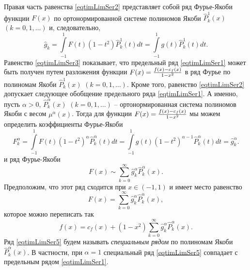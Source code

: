 Правая часть равенства \eqref{eqtimLimSer2} представляет собой ряд Фурье-Якоби функции $F(x)$ по ортонормированной системе полиномов Якоби $\hat P_k^1(x)$ $(k=0,1,\ldots)$ и, следовательно,
\begin{equation}\label{eqtimLimSer3}%
\hat g_k=\int\limits_{-1}^1F(t)(1-t^2)\hat P_k^1(t)dt
=\int\limits_{-1}^1g(t)\hat P_k^1(t)dt.
\end{equation}
Равенство \eqref{eqtimLimSer3} показывает, что предельный ряд \eqref{eqtimLimSer1} может быть получен путем разложения функции $F(x)={f(x)-c_f(x)\over 1-x^2}$
в ряд Фурье по полиномам Якоби $\hat P_k^1(x)$ $(k=0,1,\ldots)$. Кроме того, равенство \eqref{eqtimLimSer2} допускает следующее обобщение предельного ряда \eqref{eqtimLimSer1}. А именно, пусть $\alpha>0$,  $\hat P_k^\alpha(x)$ $(k=0,1,\ldots)$ -- ортонормированная система полиномов Якоби с весом $\mu^\alpha(x)$. Тогда для функции $F(x)={f(x)-c_f(x)\over 1-x^2}$ мы можем определить коэффициенты Фурье-Якоби
\begin{equation}\label{eqtimLimSer3}%
F_k^\alpha=\int\limits_{-1}^1F(t)(1-t^2)^\alpha\hat P_k^\alpha(t)dt=
\int\limits_{-1}^1g(t)(1-t^2)^{\alpha-1}\hat P_k^\alpha(t)dt=\hat g_k^\alpha.
\end{equation}
и ряд Фурье-Якоби
$$
F(x)\sim \sum_{k=0}^\infty\hat g_k^\alpha\hat P_k^\alpha(x).
$$
Предположим, что этот ряд сходится при $x\in (-1,1)$ и имеет место равенство
\begin{equation}\label{eqtimLimSer4}%
F(x)= \sum_{k=0}^\infty\hat g_k^\alpha\hat P_k^\alpha(x),
\end{equation}
которое можно переписать так
\begin{equation}\label{eqtimLimSer5}%
f(x)=c_f(x)+(1-x^2) \sum_{k=0}^\infty\hat g_k^\alpha\hat P_k^\alpha(x).
\end{equation}
Ряд \eqref{eqtimLimSer5} будем называть {\em специальным рядом} по полиномам Якоби $\hat P_k^\alpha(x)$. В частности, при $\alpha=1$ специальный ряд \eqref{eqtimLimSer5} совпадает с предельным рядом \eqref{eqtimLimSer1}.

